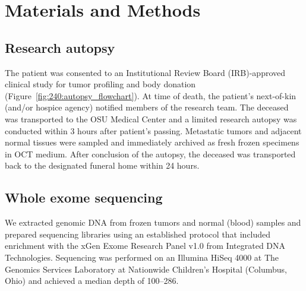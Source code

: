 \section{Materials and Methods}
\subsection{Research autopsy}
The patient was consented to an Institutional Review Board (IRB)-approved clinical study for tumor profiling and body donation (Figure~\ref{fig:240:autopsy_flowchart}). At time of death, the patient's next-of-kin (and/or hospice agency) notified members of the research team. The deceased was transported to the OSU Medical Center and a limited research autopsy was conducted within 3 hours after patient's passing. Metastatic tumors and adjacent normal tissues were sampled and immediately archived as fresh frozen specimens in OCT medium. After conclusion of the autopsy, the deceased was transported back to the designated funeral home within 24 hours. 

\subsection{Whole exome sequencing}
We extracted genomic DNA from frozen tumors and normal (blood) samples and prepared sequencing libraries using an established protocol \cite{samorodnitsky2015_hyb_amplicon} that included enrichment with the xGen Exome Research Panel v1.0 from Integrated DNA Technologies. Sequencing was performed on an Illumina HiSeq 4000 at The Genomics Services Laboratory at Nationwide Children's Hospital (Columbus, Ohio) and achieved a median depth of 100--286\texttimes{}. 

